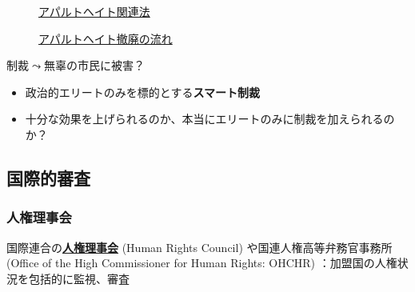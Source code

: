 \documentclass[
  xelatex,
  ja=standard]{bxjsarticle}
\providecommand{\tightlist}{%
  \setlength{\itemsep}{0pt}\setlength{\parskip}{0pt}}\usepackage{longtable,booktabs,array}
\begin{document}
\begin{figure}

\begin{minipage}[t]{0.50\linewidth}

{\centering 


\caption{\href{https://www.mofa.go.jp/mofaj/press/pr/wakaru/topics/vol49/index.html}{アパルトヘイト関連法}}

}

\end{minipage}%
%
\begin{minipage}[t]{0.50\linewidth}

{\centering 


\caption{\href{https://www.mofa.go.jp/mofaj/press/pr/wakaru/topics/vol49/index.html}{アパルトヘイト撤廃の流れ}}

}

\end{minipage}%

\end{figure}

制裁\(\leadsto\)無辜の市民に被害？

\begin{itemize}
\tightlist
\item
  政治的エリートのみを標的とする\textbf{スマート制裁}
\item
  十分な効果を上げられるのか、本当にエリートのみに制裁を加えられるのか？
\end{itemize}

\hypertarget{ux56fdux969bux7684ux5be9ux67fb}{%
\subsection{国際的審査}\label{ux56fdux969bux7684ux5be9ux67fb}}

\hypertarget{ux4ebaux6a29ux7406ux4e8bux4f1a}{%
\subsubsection{人権理事会}\label{ux4ebaux6a29ux7406ux4e8bux4f1a}}

国際連合の\href{https://www.mofa.go.jp/mofaj/gaiko/jinken_r/index.html}{\textbf{人権理事会}}
(Human Rights Council) や国連人権高等弁務官事務所 (Office of the High
Commissioner for Human Rights: OHCHR)
：加盟国の人権状況を包括的に監視、審査
\end{document}
